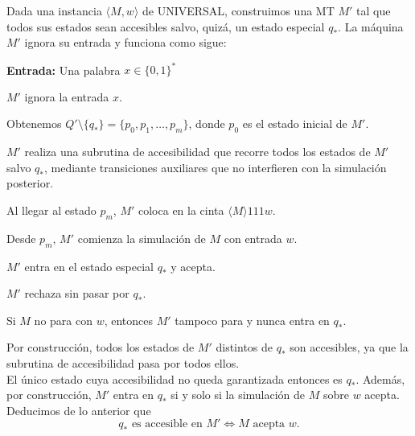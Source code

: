 \begin{ejercicio}
\begin{itemize}
        

        Dada una instancia $\langle M,w\rangle$ de UNIVERSAL, construimos una MT $M'$ tal que 
        todos sus estados sean accesibles salvo, quizá, un estado
        especial $q_*$. La máquina $M'$ ignora su entrada y funciona como sigue:

        \begin{algorithm}
            \caption{MT $M'$}
            \label{algorithm:accesibilidad-prima}
            \begin{algorithmic}
                \State \textbf{Entrada:} Una palabra $x\in\{0,1\}^{*}$

                \State $M'$ ignora la entrada $x$.

                \State Obtenemos $Q' \setminus \{q_*\}=\{p_0,p_1,\dots,p_m\}$, donde $p_0$ es el estado inicial de $M'$.

                \State $M'$ realiza una subrutina de accesibilidad que recorre todos los estados de $M'$ salvo $q_*$, 
                mediante transiciones auxiliares que no interfieren con la simulación posterior.

                \State Al llegar al estado $p_m$, $M'$ coloca en la cinta $\langle M \rangle 111 w$.

                \State Desde $p_m$, $M'$ comienza la simulación de $M$ con entrada $w$.

                    \State $M'$ entra en el estado especial $q_*$ y acepta.
                \EndIf

                    \State $M'$ rechaza sin pasar por $q_*$.
                \EndIf

                \State Si $M$ no para con $w$, entonces $M'$ tampoco para y nunca entra en $q_*$.
            \end{algorithmic}
        \end{algorithm}

        Por construcción, todos los estados de $M'$ distintos de $q_*$ son accesibles, ya que
        la subrutina de accesibilidad pasa por todos ellos. \\

        El único estado cuya accesibilidad no queda garantizada entonces es
        $q_*$. Además, por construcción, $M'$ entra en $q_*$ si y solo si la simulación de
        $M$ sobre $w$ acepta. Deducimos de lo anterior que
        $$q_* \text{ es accesible en } M' \iff M \text{ acepta } w.$$


\end{itemize}
\end{ejercicio}
